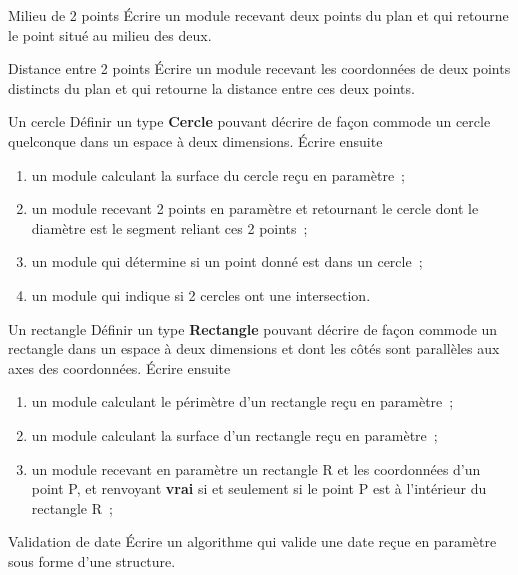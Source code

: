 		\begin{Exercice}{Milieu de 2 points}
			Écrire un module recevant deux points du plan 
			et qui retourne le point situé au milieu des deux.
		\end{Exercice}
		
		\begin{Exercice}{Distance entre 2 points}
			Écrire un module recevant les coordonnées de
			deux points distincts du plan et qui retourne
			la distance entre ces deux points.
		\end{Exercice}
		
		\begin{Exercice}{Un cercle}
			Définir un type \textbf{Cercle} pouvant décrire de façon
			commode un cercle quelconque dans un espace à deux dimensions. 	
			Écrire ensuite
			
			\begin{enumerate}[label=\alph*)]
			\item {
				un module calculant la surface du cercle reçu en paramètre~;}
			\item {
				un module recevant 2 points en paramètre et retournant le cercle dont le
				diamètre est le segment reliant ces 2 points~;}
			\item {
				un module qui détermine si un point donné est dans un cercle~;}
			\item {
				un module qui indique si 2 cercles ont une intersection.
			}
			\end{enumerate}
		\end{Exercice}
		
		
		\begin{Exercice}{Un rectangle}
			Définir un type \textbf{Rectangle} pouvant décrire de façon
			commode un rectangle dans un espace à deux dimensions et dont les côtés
			sont parallèles aux axes des coordonnées. 	
			Écrire ensuite
		
			\begin{enumerate}[label=\alph*)]
			\item {
				un module calculant le périmètre d’un rectangle reçu en paramètre~;}
			\item {
				un module calculant la surface d’un rectangle reçu en paramètre~;}
			\item {
				un module recevant en paramètre un rectangle R et les coordonnées
				d’un point P, et renvoyant 
				\textbf{vrai} si et seulement si le point P est à
				l’intérieur du rectangle R~;}
			\end{enumerate}
		\end{Exercice}
		
		\begin{Exercice}{Validation de date}
			Écrire un algorithme qui valide une date reçue en paramètre 
			sous forme d’une structure.
		\end{Exercice}

	
